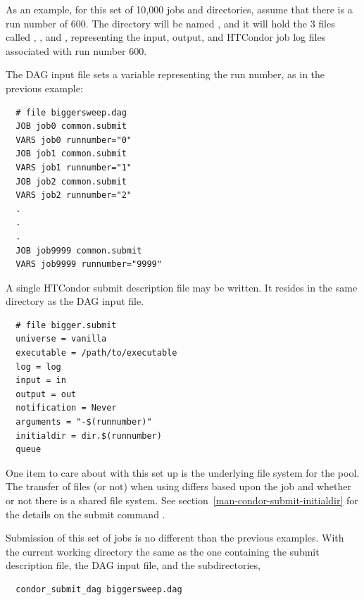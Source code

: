 As an example, for this set of 10,000 jobs and directories, assume
that there is a run number of 600.
The directory will be named , and it will
hold the 3 files called , , and ,
representing the input, output, and HTCondor job log files associated
with run number 600.

The DAG input file sets a variable representing the run number,
as in the previous example:
\begin{verbatim}
  # file biggersweep.dag
  JOB job0 common.submit
  VARS job0 runnumber="0"
  JOB job1 common.submit
  VARS job1 runnumber="1"
  JOB job2 common.submit
  VARS job2 runnumber="2"
  .
  .
  .
  JOB job9999 common.submit
  VARS job9999 runnumber="9999"
\end{verbatim}

A single HTCondor submit description file may be written.
It resides in the same directory as the DAG input file.
\begin{verbatim}
  # file bigger.submit
  universe = vanilla
  executable = /path/to/executable
  log = log
  input = in
  output = out
  notification = Never
  arguments = "-$(runnumber)"
  initialdir = dir.$(runnumber)
  queue
\end{verbatim}

One item to care about with this set up is the underlying file system 
for the pool.
The transfer of files (or not) when using 
differs based upon the job  and whether or not there
is a shared file system.
See section~\ref{man-condor-submit-initialdir} for the details on the
submit command .

Submission of this set of jobs is no different than the previous
examples.  
With the current working directory the same as the one containing
the submit description file, the DAG input file, and the subdirectories,
\begin{verbatim}
  condor_submit_dag biggersweep.dag
\end{verbatim}

